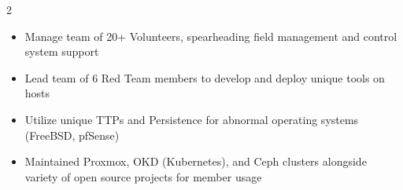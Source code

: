 \documentclass[10pt,a4paper,ragged2e,withhyper]{altacv}
\begin{document}
\begin{paracol}{2}

\begin{itemize}
\item Manage team of 20+ Volunteers, spearheading field management and control system support
\end{itemize}

\divider

\begin{itemize}
\item Lead team of 6 Red Team members to develop and deploy unique tools on hosts
\item Utilize unique TTPs and Persistence for abnormal operating systems (FreeBSD, pfSense)
\end{itemize}

\divider

\begin{itemize}
\item Maintained Proxmox, OKD (Kubernetes), and Ceph clusters alongside variety of open source projects for member usage
\end{itemize}


\medskip


\end{paracol}
\end{document}
